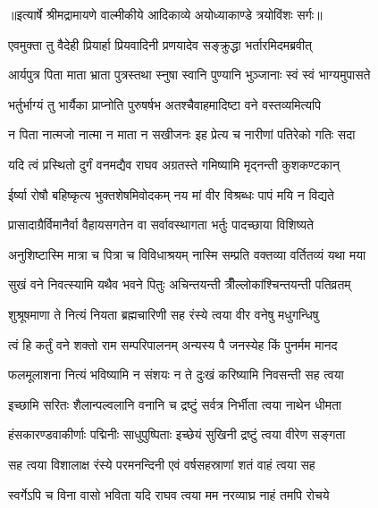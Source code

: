 {॥इत्यार्षे श्रीमद्रामायणे वाल्मीकीये आदिकाव्ये अयोध्याकाण्डे त्रयोविंशः सर्गः॥}


\twolineshloka
{एवमुक्ता तु वैदेही प्रियार्हा प्रियवादिनी}
{प्रणयादेव सङ्क्रुद्धा भर्तारमिदमब्रवीत्} %

\twolineshloka
{आर्यपुत्र पिता माता भ्राता पुत्रस्तथा स्नुषा}
{स्वानि पुण्यानि भुञ्जानाः स्वं स्वं भाग्यमुपासते} %

\twolineshloka
{भर्तुर्भाग्यं तु भार्यैका प्राप्नोति पुरुषर्षभ}
{अतश्चैवाहमादिष्टा वने वस्तव्यमित्यपि} %

\twolineshloka
{न पिता नात्मजो नात्मा न माता न सखीजनः}
{इह प्रेत्य च नारीणां पतिरेको गतिः सदा} %

\twolineshloka
{यदि त्वं प्रस्थितो दुर्गं वनमद्यैव राघव}
{अग्रतस्ते गमिष्यामि मृद्नन्ती कुशकण्टकान्} %

\twolineshloka
{ईर्ष्या रोषौ बहिष्कृत्य भुक्तशेषमिवोदकम्}
{नय मां वीर विश्रब्धः पापं मयि न विद्यते} %

\twolineshloka
{प्रासादाग्रैर्विमानैर्वा वैहायसगतेन वा}
{सर्वावस्थागता भर्तुः पादच्छाया विशिष्यते} %

\twolineshloka
{अनुशिष्टास्मि मात्रा च पित्रा च विविधाश्रयम्}
{नास्मि सम्प्रति वक्तव्या वर्तितव्यं यथा मया} %

\twolineshloka
{सुखं वने निवत्स्यामि यथैव भवने पितुः}
{अचिन्तयन्ती त्रीँल्लोकांश्चिन्तयन्ती पतिव्रतम्} %

\twolineshloka
{शुश्रूषमाणा ते नित्यं नियता ब्रह्मचारिणी}
{सह रंस्ये त्वया वीर वनेषु मधुगन्धिषु} %

\twolineshloka
{त्वं हि कर्तुं वने शक्तो राम सम्परिपालनम्}
{अन्यस्य पै जनस्येह किं पुनर्मम मानद} %

\twolineshloka
{फलमूलाशना नित्यं भविष्यामि न संशयः}
{न ते दुःखं करिष्यामि निवसन्ती सह त्वया} %

\twolineshloka
{इच्छामि सरितः शैलान्पल्वलानि वनानि च}
{द्रष्टुं सर्वत्र निर्भीता त्वया नाथेन धीमता} %

\twolineshloka
{हंसकारण्डवाकीर्णाः पद्मिनीः साधुपुष्पिताः}
{इच्छेयं सुखिनी द्रष्टुं त्वया वीरेण सङ्गता} %

\twolineshloka
{सह त्वया विशालाक्ष रंस्ये परमनन्दिनी}
{एवं वर्षसहस्राणां शतं वाहं त्वया सह} %

\twolineshloka
{स्वर्गेऽपि च विना वासो भविता यदि राघव}
{त्वया मम नरव्याघ्र नाहं तमपि रोचये} %

